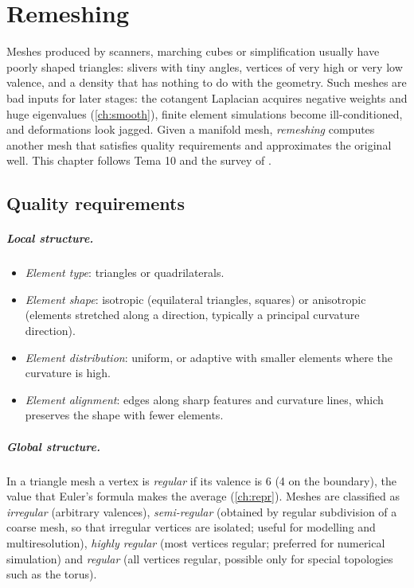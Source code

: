 \chapter{Remeshing}\label{ch:remesh}

Meshes produced by scanners, marching cubes or simplification usually have poorly shaped
triangles: slivers with tiny angles, vertices of very high or very low valence, and a density that
has nothing to do with the geometry. Such meshes are bad inputs for later stages: the cotangent
Laplacian acquires negative weights and huge eigenvalues (\cref{ch:smooth}), finite element
simulations become ill-conditioned, and deformations look jagged. Given a manifold mesh,
\emph{remeshing} computes another mesh that satisfies quality requirements and approximates the
original well. This chapter follows Tema 10 and the survey of \citet{Alliez2008}.

\section{Quality requirements}

\paragraph{Local structure.}
\begin{itemize}
  \item \emph{Element type}: triangles or quadrilaterals.
  \item \emph{Element shape}: isotropic (equilateral triangles, squares) or anisotropic
  (elements stretched along a direction, typically a principal curvature direction).
  \item \emph{Element distribution}: uniform, or adaptive with smaller elements where the
  curvature is high.
  \item \emph{Element alignment}: edges along sharp features and curvature lines, which preserves
  the shape with fewer elements.
\end{itemize}

\paragraph{Global structure.} In a triangle mesh a vertex is \emph{regular} if its valence is 6 (4
on the boundary), the value that Euler's formula makes the average (\cref{ch:repr}). Meshes are
classified as \emph{irregular} (arbitrary valences), \emph{semi-regular} (obtained by regular
subdivision of a coarse mesh, so that irregular vertices are isolated; useful for modelling and
multiresolution), \emph{highly regular} (most vertices regular; preferred for numerical
simulation) and \emph{regular} (all vertices regular, possible only for special topologies such as
the torus).

